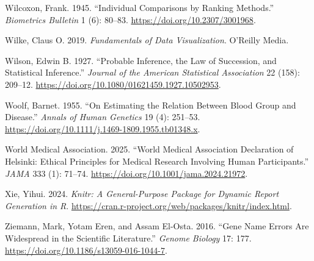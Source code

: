 \documentclass[
]{book}
\newlength{\cslhangindent}
\newenvironment{CSLReferences}[2] %
 {\begin{list}{}{%
  \setlength{\itemindent}{0pt}
  \setlength{\leftmargin}{0pt}
  \setlength{\parsep}{0pt}
  \ifodd #1
   \setlength{\leftmargin}{\cslhangindent}
   \setlength{\itemindent}{-1\cslhangindent}
  \fi
  \setlength{\itemsep}{#2\baselineskip}}}
 {\end{list}}
\begin{document}
\begin{CSLReferences}{1}{1}
Wilcoxon, Frank. 1945. {``Individual Comparisons by Ranking Methods.''} \emph{Biometrics Bulletin} 1 (6): 80--83. \url{https://doi.org/10.2307/3001968}.

Wilke, Claus O. 2019. \emph{Fundamentals of Data Visualization}. O'Reilly Media.

Wilson, Edwin B. 1927. {``Probable Inference, the Law of Succession, and Statistical Inference.''} \emph{Journal of the American Statistical Association} 22 (158): 209--12. \url{https://doi.org/10.1080/01621459.1927.10502953}.

Woolf, Barnet. 1955. {``On Estimating the Relation Between Blood Group and Disease.''} \emph{Annals of Human Genetics} 19 (4): 251--53. \url{https://doi.org/10.1111/j.1469-1809.1955.tb01348.x}.

World Medical Association. 2025. {``World Medical Association Declaration of Helsinki: Ethical Principles for Medical Research Involving Human Participants.''} \emph{JAMA} 333 (1): 71--74. \url{https://doi.org/10.1001/jama.2024.21972}.

Xie, Yihui. 2024. \emph{Knitr: A General-Purpose Package for Dynamic Report Generation in {R}}. \url{https://cran.r-project.org/web/packages/knitr/index.html}.

Ziemann, Mark, Yotam Eren, and Assam El-Osta. 2016. {``Gene Name Errors Are Widespread in the Scientific Literature.''} \emph{Genome Biology} 17: 177. \url{https://doi.org/10.1186/s13059-016-1044-7}.

\end{CSLReferences}
\end{document}

